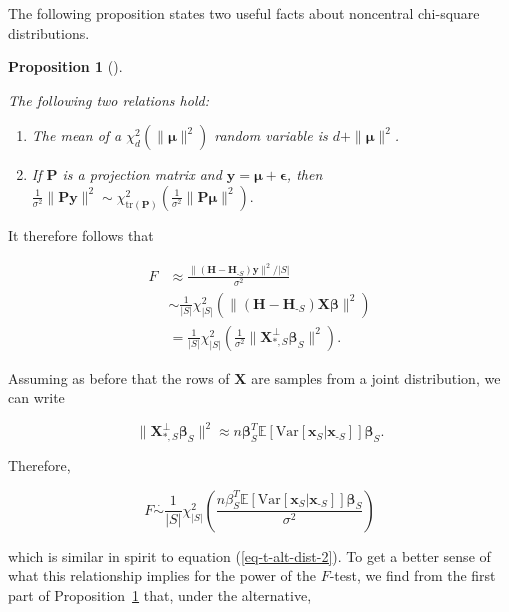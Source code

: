 \documentclass[
  11pt,
  letterpaper,
  oneside]{book}
\providecommand{\tightlist}{%
  \setlength{\itemsep}{0pt}\setlength{\parskip}{0pt}}\usepackage{longtable,booktabs,array}
\theoremstyle{plain}
\theoremstyle{plain}
\theoremstyle{definition}
\theoremstyle{definition}
\theoremstyle{plain}
\newtheorem{proposition}{Proposition}[chapter]
\theoremstyle{remark}
\begin{document}
The following proposition states two useful facts about noncentral
chi-square distributions.

\begin{proposition}[]\protect\hypertarget{prp-noncentral-chi-square}{}\label{prp-noncentral-chi-square}

The following two relations hold:

\begin{enumerate}
\def\labelenumi{\arabic{enumi}.}
\tightlist
\item
  The mean of a \(\chi^2_d(\|\boldsymbol{\mu}\|^2)\) random variable is
  \(d + \|\boldsymbol{\mu}\|^2\).
\item
  If \(\boldsymbol{P}\) is a projection matrix and
  \(\boldsymbol{y} = \boldsymbol{\mu} + \boldsymbol{\epsilon}\), then
  \(\frac{1}{\sigma^2}\|\boldsymbol{P} \boldsymbol{y}\|^2 \sim \chi^2_{\text{tr}(\boldsymbol{P})}\left(\frac{1}{\sigma^2}\|\boldsymbol{P} \boldsymbol{\mu}\|^2\right).\)
\end{enumerate}

\end{proposition}

It therefore follows that

\[
\begin{split}
F &\approx \frac{\|(\boldsymbol{H}-\boldsymbol{H}_{\text{-}S}) \boldsymbol{y}\|^2/|S|}{\sigma^2} \\
&\sim \frac{1}{|S|}\chi^2_{|S|}\left(\|(\boldsymbol{H}-\boldsymbol{H}_{\text{-}S})\boldsymbol{X} \boldsymbol{\beta}\|^2\right) \\
&= \frac{1}{|S|}\chi^2_{|S|}\left(\frac{1}{\sigma^2}\|\boldsymbol{X}^\perp_{*, S}\boldsymbol{\beta}_S\|^2\right).
\end{split}
\]

Assuming as before that the rows of \(\boldsymbol{X}\) are samples from
a joint distribution, we can write

\[
\|\boldsymbol{X}^\perp_{*, S}\boldsymbol{\beta}_S\|^2 \approx n\boldsymbol{\beta}_S^T \mathbb{E}[\text{Var}[\boldsymbol{x}_S|\boldsymbol{x}_{\text{-}S}]] \boldsymbol{\beta}_S.
\]

Therefore,

\[
F \overset{\cdot}{\sim} \frac{1}{|S|}\chi^2_{|S|}\left(\frac{n\beta_S^T \mathbb{E}[\text{Var}[\boldsymbol{x}_S|\boldsymbol{x}_{\text{-}S}]] \boldsymbol{\beta}_S}{\sigma^2}\right)
\]

which is similar in spirit to equation (\ref{eq-t-alt-dist-2}). To get a
better sense of what this relationship implies for the power of the
\(F\)-test, we find from the first part of
Proposition~\ref{prp-noncentral-chi-square} that, under the alternative,
\end{document}
